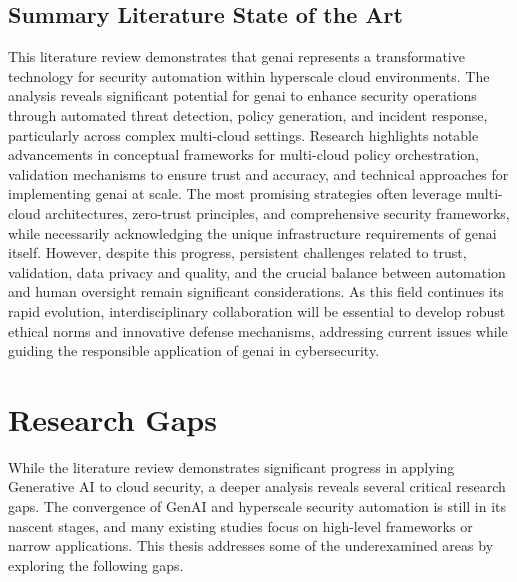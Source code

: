 
\subsection{Summary Literature State of the Art} %
\label{sec:Summary Literature State of the Art}

This literature review demonstrates that \gls{genai} represents a transformative technology for security automation within hyperscale cloud environments. The analysis reveals significant potential for \gls{genai} to enhance security operations through automated threat detection, policy generation, and incident response, particularly across complex multi-cloud settings. Research highlights notable advancements in conceptual frameworks for multi-cloud policy orchestration, validation mechanisms to ensure trust and accuracy, and technical approaches for implementing \gls{genai} at scale. The most promising strategies often leverage multi-cloud architectures, zero-trust principles, and comprehensive security frameworks, while necessarily acknowledging the unique infrastructure requirements of \gls{genai} itself. However, despite this progress, persistent challenges related to trust, validation, data privacy and quality, and the crucial balance between automation and human oversight remain significant considerations. As this field continues its rapid evolution, interdisciplinary collaboration will be essential to develop robust ethical norms and innovative defense mechanisms, addressing current issues while guiding the responsible application of \gls{genai} in cybersecurity.



\section{Research Gaps} %
\label{sec:Research Gaps}

While the literature review demonstrates significant progress in applying Generative AI to cloud security, a deeper analysis reveals several critical research gaps. The convergence of GenAI and hyperscale security automation is still in its nascent stages, and many existing studies focus on high-level frameworks or narrow applications. This thesis addresses some of the underexamined areas by exploring the following gaps.

